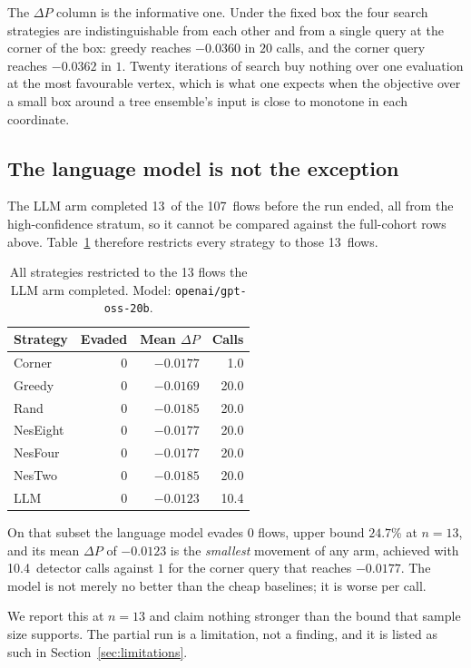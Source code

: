 \documentclass[journal]{IEEEtran}
\theoremstyle{definition}
\newcommand{\CN}{107}
\newcommand{\CCornerDp}{-0.0362}
\newcommand{\CCornerCalls}{1}
\newcommand{\CGreedyDp}{-0.0360}
\newcommand{\CGreedyCalls}{20}
\newcommand{\CLlmN}{13}
\newcommand{\CLlmEv}{0}
\newcommand{\CLlmCalls}{10.4}
\newcommand{\CLlmCPhi}{24.7}
\newcommand{\CLlmModel}{\texttt{openai/gpt-oss-20b}}
\newcommand{\CSubCornerDp}{-0.0177}
\newcommand{\CSubLlmDp}{-0.0123}
\newcommand{\CSubN}{13}
\begin{document}
The $\Delta P$ column is the informative one. Under the fixed box the four
search strategies are indistinguishable from each other and from a single
query at the corner of the box: greedy reaches $\CGreedyDp$ in $\CGreedyCalls$
calls, and the corner query reaches $\CCornerDp$ in $\CCornerCalls$. Twenty
iterations of search buy nothing over one evaluation at the most favourable
vertex, which is what one expects when the objective over a small box around a
tree ensemble's input is close to monotone in each coordinate.

\subsection{The language model is not the exception}

The LLM arm completed \CLlmN\ of the \CN\ flows before the run ended, all from
the high-confidence stratum, so it cannot be compared against the full-cohort
rows above. Table~\ref{tab:subset} therefore restricts every strategy to those
\CSubN\ flows.

\begin{table}[t]
\caption{All strategies restricted to the \CSubN{} flows the LLM arm completed.
Model: \CLlmModel.}
\label{tab:subset}
\centering
\footnotesize
\setlength{\tabcolsep}{4pt}
\begin{tabular}{lrrr}
\toprule
Strategy & Evaded & Mean $\Delta P$ & Calls \\
\midrule
Corner & 0 & $-0.0177$ & 1.0 \\
Greedy & 0 & $-0.0169$ & 20.0 \\
Rand & 0 & $-0.0185$ & 20.0 \\
NesEight & 0 & $-0.0177$ & 20.0 \\
NesFour & 0 & $-0.0177$ & 20.0 \\
NesTwo & 0 & $-0.0185$ & 20.0 \\
LLM & 0 & $-0.0123$ & 10.4 \\
\bottomrule
\end{tabular}
\end{table}

On that subset the language model evades $\CLlmEv$ flows, upper bound
$\CLlmCPhi$\% at $n=\CLlmN$, and its mean $\Delta P$ of $\CSubLlmDp$ is the
\emph{smallest} movement of any arm, achieved with \CLlmCalls\ detector calls
against $\CCornerCalls$ for the corner query that reaches $\CSubCornerDp$. The
model is not merely no better than the cheap baselines; it is worse per call.

We report this at $n=\CLlmN$ and claim nothing stronger than the bound that
sample size supports. The partial run is a limitation, not a finding, and it is
listed as such in Section~\ref{sec:limitations}.
\end{document}
